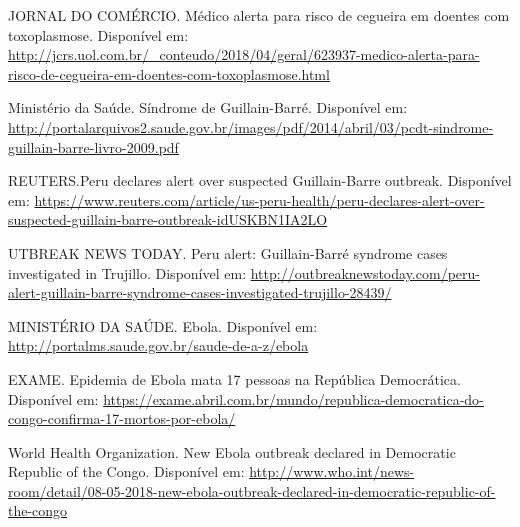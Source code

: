 \documentclass{article}
\begin{document}
\begin{enumerate}
{	\item JORNAL DO COMÉRCIO. Médico alerta para risco de cegueira em doentes com toxoplasmose. Disponível em: \url{http://jcrs.uol.com.br/_conteudo/2018/04/geral/623937-medico-alerta-para-risco-de-cegueira-em-doentes-com-toxoplasmose.html}

   \item Ministério da Saúde. Síndrome de Guillain-Barré. Disponível em: \url{http://portalarquivos2.saude.gov.br/images/pdf/2014/abril/03/pcdt-sindrome-guillain-barre-livro-2009.pdf}
  
	\item REUTERS.Peru declares alert over suspected Guillain-Barre outbreak. Disponível em: \url{https://www.reuters.com/article/us-peru-health/peru-declares-alert-over-suspected-guillain-barre-outbreak-idUSKBN1IA2LO}

	\item UTBREAK NEWS TODAY. Peru alert: Guillain-Barré syndrome cases investigated in Trujillo. Disponível em: \url{http://outbreaknewstoday.com/peru-alert-guillain-barre-syndrome-cases-investigated-trujillo-28439/}

	\item MINISTÉRIO DA SAÚDE. Ebola. Disponível em: \url{http://portalms.saude.gov.br/saude-de-a-z/ebola}
 
	\item EXAME. Epidemia de Ebola mata 17 pessoas na República Democrática. Disponível em: \url{https://exame.abril.com.br/mundo/republica-democratica-do-congo-confirma-17-mortos-por-ebola/}

	\item World Health Organization. New Ebola outbreak declared in Democratic Republic of the Congo. Disponível em: \url{http://www.who.int/news-room/detail/08-05-2018-new-ebola-outbreak-declared-in-democratic-republic-of-the-congo}

} %
\end{enumerate}

\end{document}
